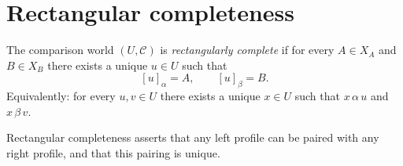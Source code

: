 \section{Rectangular completeness}
\label{sec:rect}
\begin{definition}
	\label{def:rect}
	The comparison world \((U,\mathcal C)\) is \emph{rectangularly complete}
	if for every \(A\in X_A\) and \(B\in X_B\) there exists a unique
	\(u\in U\) such that
	\[
		[u]_\alpha=A,
		\qquad
		[u]_\beta=B.
	\]
	Equivalently: for every \(u,v\in U\) there exists a unique \(x\in U\)
	such that \(x\,\alpha\,u\) and \(x\,\beta\,v\).
\end{definition}
\begin{remark}
	Rectangular completeness asserts that any left profile can be paired
	with any right profile, and that this pairing is unique.
\end{remark}
